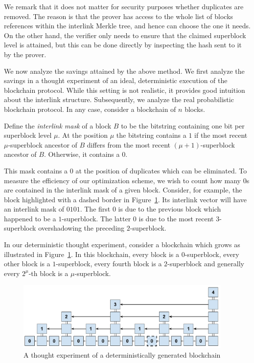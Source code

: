 We remark that it does not matter for security purposes whether duplicates are
removed. The reason is that the prover has access to the whole list of blocks
references within the interlink Merkle tree, and hence can choose the one it
needs. On the other hand, the verifier only needs to ensure that the claimed
superblock level is attained, but this can be done directly by inspecting the
hash sent to it by the prover.

We now analyze the savings attained by the above method. We first analyze the
savings in a thought experiment of an ideal, deterministic execution of the
blockchain protocol. While this setting is not realistic, it provides good
intuition about the interlink structure. Subsequently, we analyze the real
probabilistic blockchain protocol. In any case, consider a blockchain of $n$
blocks.

\begin{definition}
Define the \emph{interlink mask} of a block $B$ to be the bitstring containing
one bit per superblock level $\mu$. At the position $\mu$ the bitstring contains
a $1$ if the most recent $\mu$-superblock ancestor of $B$ differs from the most
recent $(\mu+1)$-superblock ancestor of $B$. Otherwise, it contains a $0$.
\end{definition}

This mask contains a $0$ at the position of duplicates which can be eliminated.
To measure the efficiency of our optimization scheme, we wish to count how many
$0$s are contained in the interlink mask of a given block. Consider, for
example, the block highlighted with a dashed border in
Figure~\ref{fig.deterministic}. Its interlink vector will have an interlink mask
of $0101$. The first $0$ is due to the previous block which happened to be a
$1$-superblock. The latter $0$ is due to the most recent $3$-superblock
overshadowing the preceding $2$-superblock.

In our deterministic thought experiment, consider a blockchain which grows as
illustrated in Figure~\ref{fig.deterministic}. In this blockchain, every block
is a $0$-superblock, every other block is a $1$-superblock, every fourth block
is a $2$-superblock and generally every $2^\mu$-th block is a
$\mu$-superblock.

\begin{figure}[h]
\begin{center}
  \includegraphics[width=0.95\textwidth]{figures/deterministic-superblocks.pdf}
  \caption{A thought experiment of a deterministically generated blockchain}
  \label{fig.deterministic}
  \end{center}
\end{figure}

